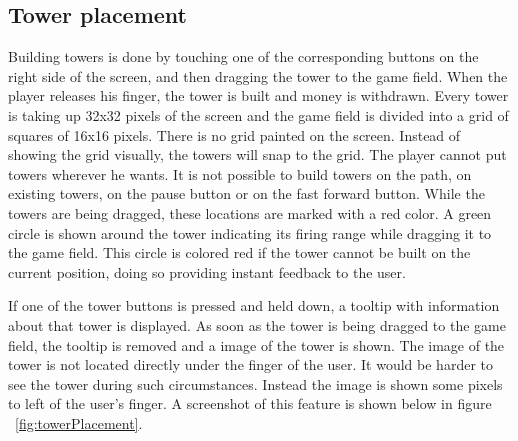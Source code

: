 \subsection{Tower placement}

Building towers is done by touching one of the corresponding buttons on the right side of the screen, and then dragging the tower to the game field. When the player releases his finger, the tower is built and money is withdrawn. Every tower is taking up 32x32 pixels of the screen and the game field is divided into a grid of squares of 16x16 pixels. There is no grid painted on the screen. Instead of showing the grid visually, the towers will snap to the grid. The player cannot put towers wherever he wants. It is not possible to build towers on the path, on existing towers, on the pause button or on the fast forward button. While the towers are being dragged, these locations are marked with a red color. A green circle is shown around the tower indicating its firing range while dragging it to the game field. This circle is colored red if the tower cannot be built on the current position, doing so providing instant feedback to the user.

If one of the tower buttons is pressed and held down, a tooltip with information about that tower is displayed. As soon as the tower is being dragged to the game field, the tooltip is removed and a image of the tower is shown. The image of the tower is not located directly under the finger of the user. It would be harder to see the tower during such circumstances. Instead the image is shown some pixels to left of the user's finger. A screenshot of this feature is shown below in figure ~\ref{fig:towerPlacement}.


